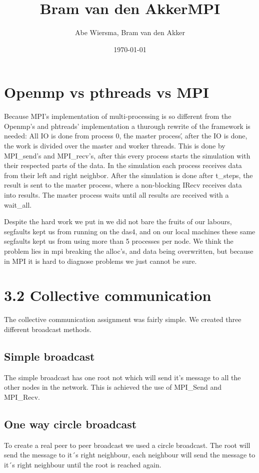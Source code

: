 \documentclass[10pt]{article}
\title{\bfseries\Huge Bram van den Akker}
\date{}
\begin{document}
\title{MPI}
\author{Abe Wiersma, Bram van den Akker}
\date{\today}
\maketitle
\newpage

\section{Openmp vs pthreads vs MPI}
Because MPI's implementation of multi-processing is so different from the Openmp's and phtreads' implementation a thurough rewrite of the framework is needed:
All IO is done from process 0, \'the master process\', after the IO is done, the work is divided over the master and worker threads.
This is done by MPI\_send's and MPI\_recv's, after this every process starts the simulation with their respected parts of the data.
In the simulation each process receives data from their left and right neighbor.
After the simulation is done after t\_steps, the result is sent to the master process, where a non-blocking IRecv receives data into results. The master process waits until all results are received with a wait\_all.

Despite the hard work we put in we did not bare the fruits of our labours, segfaults kept us from running on the das4,
and on our local machines these same segfaults kept us from using more than 5 processes per node.
We think the problem lies in mpi breaking the alloc's, and data being overwritten, but because in MPI it is hard to diagnose problems we just cannot be sure.

\section{3.2 Collective communication}
The collective communication assignment was fairly simple. We created three different broadcast methods. 

\subsection{Simple broadcast}
The simple broadcast has one root not which will send it's message to all the other nodes in the network. This is achieved the use of MPI\_Send and MPI\_Recv.
\subsection{One way circle broadcast}
To create a real peer to peer broadcast we used a circle broadcast. The root will send the message to it´s right neighbour, each neighbour will send the message to it´s right neighbour until the root is reached again. 
\end{document}
